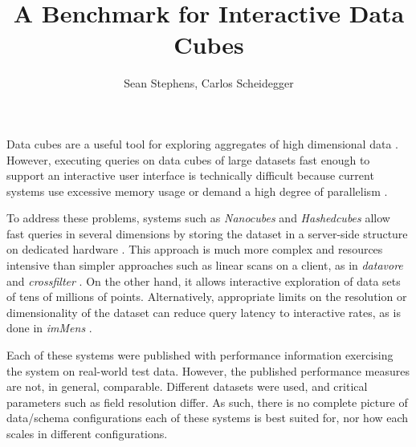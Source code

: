 \documentclass[journal]{vgtc}                %
\title{A Benchmark for Interactive Data Cubes}
\author{Sean Stephens, Carlos Scheidegger}
\begin{document}
\large{



\maketitle

Data cubes are a useful tool for exploring aggregates of high dimensional data
\cite{data_cubes}. However, executing queries on data cubes of large datasets
fast enough to support an interactive user interface is technically difficult
because current systems use excessive memory usage or demand a high degree of
parallelism \cite{nanocubes, parallel_paper}.

To address these problems, systems such as \textit{Nanocubes} and
\textit{Hashedcubes} allow fast queries in several dimensions by storing the
dataset in a server-side structure on dedicated hardware
\cite{nanocube}\cite{hashedcube}. This approach is much more complex and
resources intensive than simpler approaches such as linear scans on a client,
as in \textit{datavore} and \textit{crossfilter} \cite{datavore,crossfilter}.
On the other hand, it allows interactive exploration of data sets of tens of
millions of points. Alternatively, appropriate limits on the resolution or dimensionality of the dataset can reduce query latency to interactive rates, as is done in \textit{imMens} \cite{2013-immens}. 

Each of these systems were published with performance information exercising
the system on real-world test data. However, the published performance measures
are not, in general, comparable. Different datasets were used, and critical
parameters such as field resolution differ. As such, there is no complete
picture of data/schema configurations each of these systems is best suited for,
nor how each scales in different configurations.

}
\end{document}
